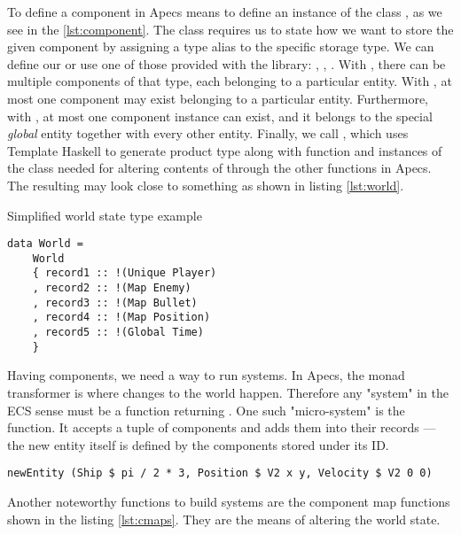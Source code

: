 \documentclass[
  digital, %
  table,   %
  twoside, %
  lof,     %
  lot,     %
]{fithesis3}
\begin{document}
To define a component in Apecs means to define an instance of the class ,
as we see in the \ref{lst:component}.
The  class
requires us to state how we want to store the given component
by assigning a type alias to the specific storage type.
We can define our  or use one of those provided
with the library: , , .
With , there can be multiple components of that type,
each belonging to a particular entity.
With , at most one component may exist
belonging to a particular entity. Furthermore,
with , at most one component instance can exist,
and it belongs to the special \emph{global} entity together
with every other entity. Finally, we call ,
which uses Template Haskell to generate  product type
along with  function and instances of the 
class needed for altering contents of  through
the other functions in Apecs. The resulting 
may look close to something as shown in listing \ref{lst:world}.

\begin{listing}
\label{lst:world}
\caption{Simplified world state type example}
\begin{verbatim}
data World =
    World
    { record1 :: !(Unique Player)
    , record2 :: !(Map Enemy)
    , record3 :: !(Map Bullet)
    , record4 :: !(Map Position)
    , record5 :: !(Global Time)
    }
\end{verbatim}
\end{listing}

Having components, we need a way to run systems. In Apecs,
the  monad transformer is where changes to the world happen.
Therefore any "system" in the ECS sense must be a function returning .
One such "micro-system" is the  function.
It accepts a tuple of components and adds them into
their records — the new entity itself is defined by the components stored under its ID.
\begin{verbatim}
newEntity (Ship $ pi / 2 * 3, Position $ V2 x y, Velocity $ V2 0 0)
\end{verbatim}
Another noteworthy functions to build systems are the component map functions
shown in the listing \ref{lst:cmaps}. They are the means of altering the world state.
\end{document}
